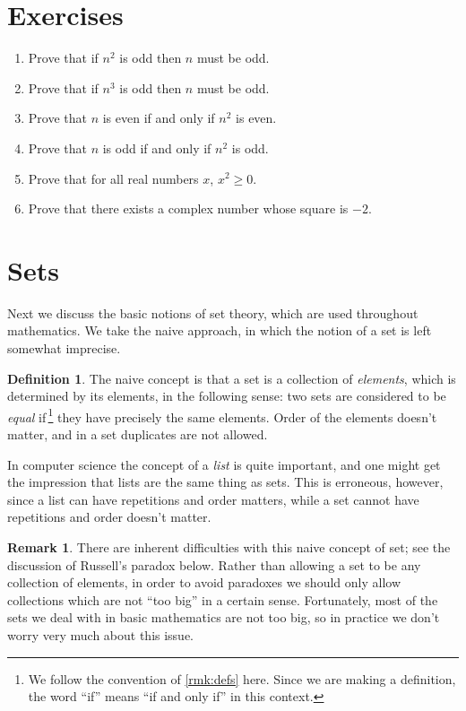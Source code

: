 \documentclass[11pt]{article}
\newenvironment{problems}
{
 \begin{enumerate}[topsep=1pt,itemsep=0pt,parsep=2pt,leftmargin=0.6cm,%
 label={\arabic*.}, ref=\arabic*] \small
}
{
 \end{enumerate}
}
\theoremstyle{definition}
\newtheorem{defn}[thm]{Definition}
\newtheorem{rmk}[thm]{Remark}
\begin{document}
\section*{Exercises}
\begin{problems}

\item Prove that if $n^2$ is odd then $n$ must be odd.

\item Prove that if $n^3$ is odd then $n$ must be odd.

\item Prove that $n$ is even if and only if $n^2$ is even.

\item Prove that $n$ is odd if and only if $n^2$ is odd.

\item Prove that for all real numbers $x$, $x^2 \ge 0$. 

\item Prove that there exists a complex number whose square is $-2$.

\end{problems}


\newpage\section{Sets}\noindent
Next we discuss the basic notions of set theory, which are used
throughout mathematics. We take the naive approach, in which the
notion of a set is left somewhat imprecise.  

\begin{defn}
  The naive concept is that a set is a collection of
  \emph{elements}, which is determined by its elements, in the
  following sense: two sets are considered to be {\em equal}
  if\,\footnote{We follow the convention of \ref{rmk:defs} here. Since
    we are making a definition, the word ``if'' means ``if and only
    if'' in this context.} they have precisely the same
  elements. Order of the elements doesn't matter, and in a set
  duplicates are not allowed.
\end{defn}


In computer science the concept of a \emph{list} is quite important,
and one might get the impression that lists are the same thing as
sets. This is erroneous, however, since a list can have repetitions
and order matters, while a set cannot have repetitions and order
doesn't matter.

\begin{rmk}
  There are inherent difficulties with this naive concept of set; see
  the discussion of Russell's paradox
  below. Rather than allowing a set to be any collection of elements,
  in order to avoid paradoxes we should only allow collections which
  are not ``too big'' in a certain sense. Fortunately, most of the
  sets we deal with in basic mathematics are not too big, so in
  practice we don't worry very much about this issue.
\end{rmk}
\end{document}
